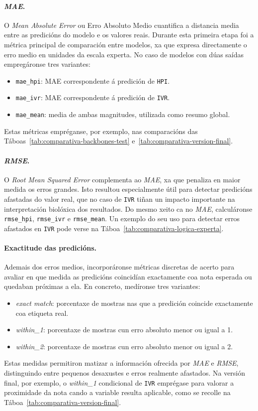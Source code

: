 \paragraph{\textit{MAE}.}
O \textit{Mean Absolute Error} ou Erro Absoluto Medio cuantifica a distancia media entre as
predicións do modelo e os valores reais. Durante esta primeira etapa foi a métrica principal de
comparación entre modelos, xa que expresa directamente o erro medio en unidades da escala experta.
No caso de modelos con dúas saídas empregáronse tres variantes:
\begin{itemize}
    \item \texttt{mae\_hpi}: MAE correspondente á predición de \texttt{HPI}.
    \item \texttt{mae\_ivr}: MAE correspondente á predición de \texttt{IVR}.
    \item \texttt{mae\_mean}: media de ambas magnitudes, utilizada como resumo global.
\end{itemize}
Estas métricas empréganse, por exemplo, nas comparacións das Táboas~\ref{tab:comparativa-backbones-test}
e~\ref{tab:comparativa-version-final}.

\paragraph{\textit{RMSE}.}
O \textit{Root Mean Squared Error} complementa ao \textit{MAE}, xa que penaliza en maior medida os
erros grandes. Isto resultou especialmente útil para detectar predicións afastadas do valor real,
que no caso de \texttt{IVR} tiñan un impacto importante na interpretación biolóxica dos resultados.
Do mesmo xeito ca no \textit{MAE}, calculáronse \texttt{rmse\_hpi}, \texttt{rmse\_ivr} e
\texttt{rmse\_mean}. Un exemplo do seu uso para detectar erros afastados en \texttt{IVR} pode verse
na Táboa~\ref{tab:comparativa-logica-experta}.

\paragraph{Exactitude das predicións.}
Ademais dos erros medios, incorporáronse métricas discretas de acerto para avaliar en que medida as
predicións coincidían exactamente coa nota esperada ou quedaban próximas a ela. En concreto,
medíronse tres variantes:
\begin{itemize}
    \item \textit{exact match}: porcentaxe de mostras nas que a predición coincide exactamente coa etiqueta real.
    \item \textit{within\_1}: porcentaxe de mostras cun erro absoluto menor ou igual a 1.
    \item \textit{within\_2}: porcentaxe de mostras cun erro absoluto menor ou igual a 2.
\end{itemize}
Estas medidas permitiron matizar a información ofrecida por \textit{MAE} e \textit{RMSE},
distinguindo entre pequenos desaxustes e erros realmente afastados. Na versión final, por exemplo,
o \textit{within\_1} condicional de \texttt{IVR} emprégase para valorar a proximidade da nota cando
a variable resulta aplicable, como se recolle na Táboa~\ref{tab:comparativa-version-final}.

